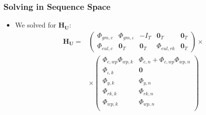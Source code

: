 \documentclass[english,xcolor=svgnames]{beamer}
\begin{document}
\begin{frame}
    \frametitle{Solving in Sequence Space}
		\begin{itemize}
			\item We solved for $\mathbf{H}_{\mathbf{U}}$:
			\begin{align*}
				\mathbf{H}_{\mathbf{U}} =&\begin{pmatrix}
					\Phi_{gm,c} & \Phi_{gm,\iota} & - I_T & \mathbf{0}_T & \mathbf{0}_T \\ 
					\Phi_{eul,c} & \mathbf{0}_T & \mathbf{0}_T & \Phi_{eul,rk} & \mathbf{0}_T  
				\end{pmatrix} \times \\
				& \times \begin{pmatrix}
					\Phi_{c,wp}\Phi_{wp,k} & \Phi_{c,n} + \Phi_{c,wp}\Phi_{wp,n} \\
					\Phi_{\iota,k} & \mathbf{0} \\
					\Phi_{y,k} & \Phi_{y,n} \\
					\Phi_{rk,k} & \Phi_{rk,n} \\
					\Phi_{wp,k} & \Phi_{wp,n} \\
				\end{pmatrix}
			\end{align*}
		\end{itemize}
\end{frame}
\end{document}
